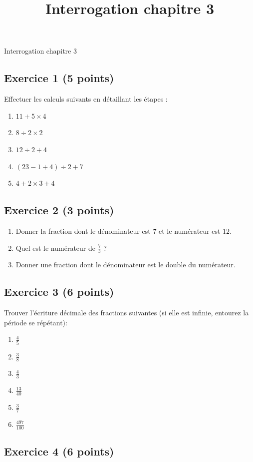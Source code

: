 \documentclass[14 pt]{extarticle}
\title{Interrogation chapitre 3}
\date{}
\theoremstyle{plain}
\begin{document}
\begin{center}{\Large Interrogation chapitre 3}\\ 
 \end{center}
 
 
 \subsection*{Exercice 1 (5 points)}
 
 Effectuer les calculs suivants en détaillant les étapes : 
 \begin{enumerate}
 \item $11 + 5 \times 4$
 \item $ 8 \div 2 \times 2$
 \item $ 12 \div 2 + 4$
 \item $ (23 - 1 + 4) \div 2 + 7$
 \item $ 4 + 2 \times 3 + 4$
 \end{enumerate} 
 \subsection*{Exercice 2 (3 points)}
 
 \begin{enumerate}
 \item Donner la fraction dont le dénominateur est $7$ et le numérateur est $12$. 
 \item Quel est le numérateur de $\frac73$ ?
 \item Donner une fraction dont le dénominateur est le double du numérateur. 
 \end{enumerate}
 
 \subsection*{Exercice 3 (6 points)}
Trouver l'écriture décimale des fractions suivantes (si elle est infinie, entourez la période se répétant): 
\begin{enumerate}
\item $\frac45$
\item $\frac38$
\item $\frac43$
\item $\frac{13}{40}$
\item $\frac37$
\item $\frac{497}{100}$
\end{enumerate}
 \subsection*{Exercice 4 (6 points)}
 
\end{document}

